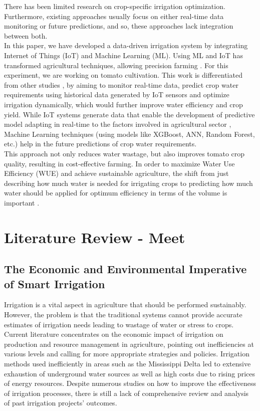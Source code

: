 \documentclass[conference]{IEEEtran}
\begin{document}
There has been limited research on crop-specific irrigation optimization. Furthermore, existing approaches usually focus on either real-time data monitoring or future predictions, and so, these approaches lack integration between both. \\
In this paper, we have developed a data-driven irrigation system by integrating Internet of Things (IoT) and Machine Learning (ML). Using ML and IoT has transformed agricultural techniques, allowing precision farming \cite{s25123583}. For this experiment, we are working on tomato cultivation. This work is differentiated from other studies \cite{tomato_dataset}, by aiming to monitor real-time data, predict crop water requirements using historical data generated by IoT sensors and optimize irrigation dynamically, which would further improve water efficiency and crop yield. While IoT systems generate data that enable the development of predictive model adapting in real-time to the factors involved in agricultural sector \cite{sensor,10.3389/fpls.2025.1587869}, Machine Learning techniques (using models like XGBoost, ANN, Random Forest, etc.) help in the future predictions of crop water requirements. \\
This approach not only reduces water wastage, but also improves tomato crop quality, resulting in cost-effective farming. In order to maximize Water Use Efficiency (WUE) and achieve sustainable agriculture, the shift from just describing how much water is needed for irrigating crops to predicting how much water should be applied for optimum efficiency in terms of the volume is important \cite{100ii,iii}.


\section{Literature Review - Meet}
\subsection{The Economic and Environmental Imperative of Smart Irrigation}
Irrigation is a vital aspect in agriculture that should be performed sustainably. However, the problem is that the traditional systems cannot provide accurate estimates of irrigation needs leading to wastage of water or stress to crops. Current literature concentrates on the economic impact of irrigation on production and resource management in agriculture, pointing out inefficiencies at various levels and calling for more appropriate strategies and policies. Irrigation methods used inefficiently in areas such as the Mississippi Delta led to extensive exhaustion of underground water sources as well as high costs due to rising prices of energy resources. Despite numerous studies on how to improve the effectiveness of irrigation processes, there is still a lack of comprehensive review and analysis of past irrigation projects' outcomes\cite{inbook}.
\end{document}
